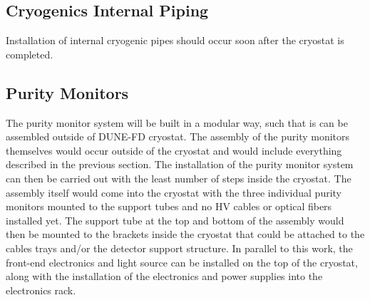 
\subsection{Cryogenics Internal Piping}
\label{sec:fdsp-slow-cryo-install-pipes}

Installation of internal cryogenic pipes should occur soon after the cryostat is completed.

\subsection{Purity Monitors}
\label{sec:fdsp-slow-cryo-instal-pm}

The purity monitor system will be built in a modular way, such that is can be assembled outside of DUNE-FD cryostat.  The assembly of the purity monitors themselves would occur outside of the cryostat and would include everything described in the previous section.  The installation of the purity monitor system can then be carried out with the least number of steps inside the cryostat.  The assembly itself would come into the cryostat with the three individual purity monitors mounted to the support tubes and no HV cables or optical fibers installed yet.  The support tube at the top and bottom of the assembly would then be mounted to the brackets inside the cryostat that could be attached to the cables trays and/or the detector support structure.  In parallel to this work, the front-end electronics and light source can be installed on the top of the cryostat, along with the installation of the electronics and power supplies into the electronics rack.  

